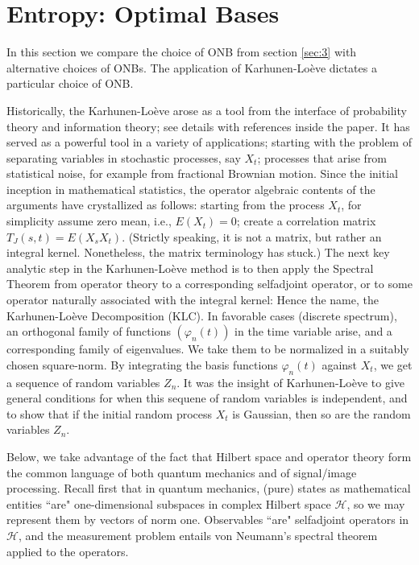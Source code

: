 \documentclass{amsart}
\theoremstyle{definition}
\theoremstyle{remark}
\numberwithin{equation}{section}
\begin{document}
\section{Entropy: Optimal Bases}
\label{sec:6}
In this section we compare the choice of ONB from section \ref{sec:3} with 
alternative choices of ONBs. The application of Karhunen-Lo\`{e}ve dictates 
a particular choice of ONB.  

Historically, the Karhunen-Lo\`{e}ve arose as a tool from the interface of 
probability theory and information theory; see details with references 
inside the paper. It has served as a powerful tool in a variety of 
applications; starting with the problem of separating variables in 
stochastic processes, say $X_{t}$; processes that arise from statistical 
noise, for example from fractional Brownian motion. Since the initial 
inception in mathematical statistics, the operator algebraic contents of 
the arguments have crystallized as follows: starting from the process 
$X_{t}$,  for simplicity assume zero mean, i.e., $E(X_{t}) = 0$; create a 
correlation matrix  $T_{J}(s,t) = E(X_{s} X_{t})$. (Strictly speaking, it is 
not a matrix, but rather an integral kernel. Nonetheless, the matrix 
terminology has stuck.) The next key analytic step in the Karhunen-Lo\`{e}ve 
method is to then apply the Spectral Theorem from operator theory to a 
corresponding selfadjoint operator, or to some operator naturally associated 
with the integral kernel: Hence the name, the Karhunen-Lo\`{e}ve 
Decomposition (KLC). In 
favorable cases (discrete spectrum), an orthogonal family of functions 
$(\varphi_{n}(t))$ in the time variable arise, and a corresponding family of 
eigenvalues. We take them to be normalized in a suitably chosen 
square-norm. By integrating the basis functions $\varphi_{n}(t)$ against 
$X_{t}$, we get a sequence of random variables $Z_{n}$. It was the insight of 
Karhunen-Lo\`{e}ve \cite{Loe52} to give general conditions for when this 
sequene of random variables is independent, and to show that if the 
initial random process $X_{t}$ is Gaussian, then so are the random 
variables $Z_{n}$. 

Below, we take advantage of the fact that Hilbert space and operator 
theory form the common language of both quantum mechanics and of signal/image 
processing. Recall first that in quantum mechanics, (pure) states as 
mathematical entities ``are" one-dimensional subspaces in complex Hilbert 
space $\mathcal{H}$, so we may represent them by vectors of norm one. 
Observables ``are" selfadjoint operators in $\mathcal{H}$, and the 
measurement problem entails von Neumann's spectral theorem applied to the 
operators.
\end{document}
